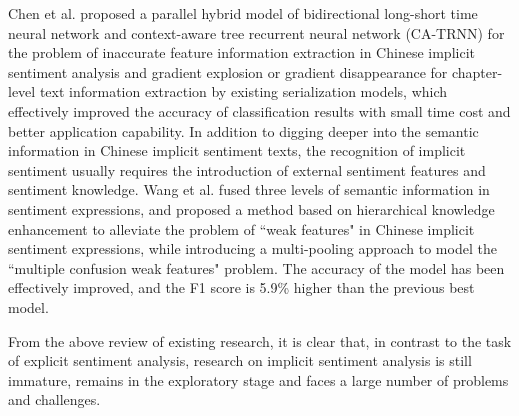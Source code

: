 Chen et al.\cite {ChenQiuChang2022} proposed a parallel hybrid model of bidirectional long-short time neural network and context-aware tree recurrent neural network (CA-TRNN) for the problem of inaccurate feature information extraction in Chinese implicit sentiment analysis and gradient explosion or gradient disappearance for chapter-level text information extraction by existing serialization models, which effectively improved the accuracy of classification results with small time cost and better application capability.
In addition to digging deeper into the semantic information in Chinese implicit sentiment texts, the recognition of implicit sentiment usually requires the introduction of external sentiment features and sentiment knowledge.
Wang et al. \cite{wang2020chinese} fused three levels of semantic information in sentiment expressions, and proposed a method based on hierarchical knowledge enhancement to alleviate the problem of ``weak features" in Chinese implicit sentiment expressions, while introducing a multi-pooling approach to model the ``multiple confusion weak features" problem. The accuracy of the model has been effectively improved, and the F1 score is 5.9\% higher than the previous best model.

From the above review of existing research, it is clear that, in contrast to the task of explicit sentiment analysis, research on implicit sentiment analysis is still immature, remains in the exploratory stage and faces a large number of problems and challenges.
